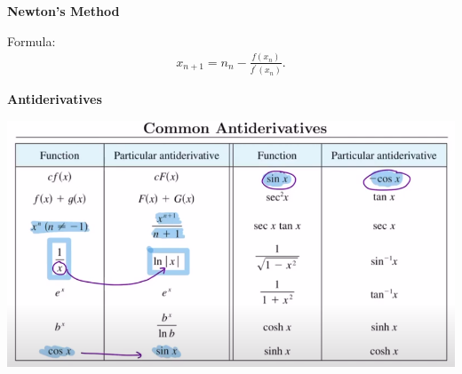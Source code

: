 \documentclass{report}
\begin{document}
     \bigbreak \noindent \bigbreak \noindent 
     \begin{large}
         \textbf{Newton's Method}
     \end{large}
     \bigbreak \noindent 
     Formula:
     \begin{align*}
         x_{n+1} = n_{n} -\frac{f(x_{n})}{f^{\prime}(x_{n})}
     .\end{align*}

     \bigbreak \noindent \bigbreak \noindent 
     \begin{large}
         \textbf{Antiderivatives}
     \end{large}
     \bigbreak \noindent 
       \bigbreak \noindent 
      \begin{center}
          \includegraphics[scale=0.6]{ ../../notes/lectures/chapter4/images/26.png}
      \end{center}


    
\end{document}
